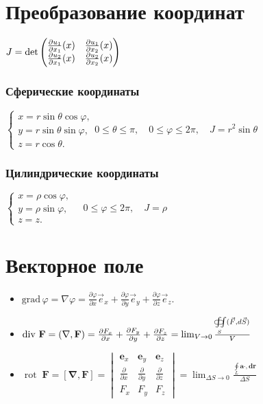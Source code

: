 \section{Преобразование координат}

$J = \det {\begin{pmatrix}{\frac{\partial{u_{1}}}{\partial{x_{1}}}}(x)&{\frac{\partial{u_{1}}}{\partial{x_{2}}}}(x)\\{\frac{\partial{u_{2}}}{\partial{x_{1}}}}(x)&{\frac{\partial{u_{2}}}{\partial{x_{2}}}}(x)\end{pmatrix}}$

\subsubsection{Сферические координаты} 

${\begin{cases}x=r\sin \theta \cos \varphi ,\\y=r\sin \theta \sin \varphi ,\\z=r\cos \theta .\end{cases}} 0 \le \theta \le \pi, \quad 0 \le \varphi \le 2\pi, \quad J=r^{2}\sin \theta $

\subsubsection{Цилиндрические координаты}
${\begin{cases}x=\rho \cos \varphi ,\\y=\rho \sin \varphi ,\\z=z.\end{cases}} \quad 0 \le \varphi \le 2\pi, \quad J = \rho$


\section{Векторное поле}

\begin{itemize}
	\item
	${\mathrm  {grad}}\,\varphi =\nabla \varphi ={\frac  {\partial \varphi }{\partial x}}{\vec  e}_{x}+{\frac  {\partial \varphi }{\partial y}}{\vec  e}_{y}+{\frac  {\partial \varphi }{\partial z}}{\vec  e}_{z}.$
	
	\item
	$\operatorname {div}\,{\mathbf  {F}}= (\nabla , {\mathbf  {F}})= {\frac  {\partial F_{x}}{\partial x}}+{\frac  {\partial F_{y}}{\partial y}}+{\pd{F_{z}}{z}} = \lim _{{V\rightarrow 0}}{\frac{\iint \limits _{S}\!\!\!\!\!\!\!\!\!\!\subset \!\supset \;({\vec  F},d{\vec  S})}{V}}$
	
	\item
	$\operatorname{rot}\; \mathbf{F} = [\mathbf{\nabla} , \mathbf{F}] = \begin{vmatrix} \mathbf{e}_x & \mathbf{e}_y & \mathbf{e}_z \\  
	\frac{\partial}{\partial x} & \frac{\partial}{\partial y} & \frac{\partial}{\partial z} 
	\\  F_x & F_y & F_z 
	\end{vmatrix} 
	= \lim_{\Delta S\to 0}\frac{\oint\limits_{L}\mathbf{ a\cdot , dr}}{\Delta S}$
	
\end{itemize}

